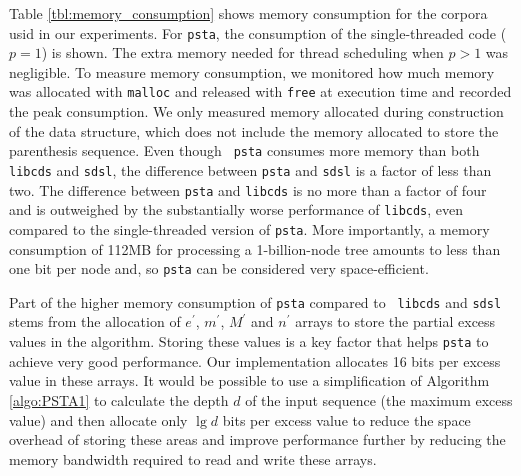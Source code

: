 Table \ref{tbl:memory_consumption} shows memory consumption for the
corpora usid in our experiments.  For {\tt psta}, the consumption of
the single-threaded code ($p = 1$) is shown.  The extra memory needed
for thread scheduling when $p > 1$ was negligible.  To measure memory
consumption, we monitored how much memory was allocated with
\texttt{malloc} and released with \texttt{free} at execution time and
recorded the peak consumption.  We only measured memory allocated
during construction of the data structure, which does not include the
memory allocated to store the parenthesis sequence.  Even though {\tt
  psta} consumes more memory than both {\tt libcds} and {\tt sdsl},
the difference between {\tt psta} and {\tt sdsl} is a factor of less
than two.  The difference between {\tt psta} and {\tt libcds} is no
more than a factor of four and is outweighed by the substantially
worse performance of {\tt libcds}, even compared to the
single-threaded version of {\tt psta}.  More importantly, a memory
consumption of 112MB for processing a 1-billion-node tree amounts to
less than one bit per node and, so {\tt psta} can be considered very
space-efficient.


Part of the higher memory consumption of {\tt psta} compared to {\tt
  libcds} and {\tt sdsl} stems from the allocation of $e^{\prime}$,
$m^{\prime}$, $M^{\prime}$ and $n^{\prime}$ arrays to store the
partial excess values in the algorithm.  Storing these values is a key
factor that helps {\tt psta} to achieve very good performance.  Our
implementation allocates 16 bits per excess value in these arrays.  It
would be possible to use a simplification of Algorithm
\ref{algo:PSTA1} to calculate the depth $d$ of the input sequence (the
maximum excess value) and then allocate only $\lg d$ bits per excess
value to reduce the space overhead of storing these areas and improve
performance further by reducing the memory bandwidth required to read
and write these arrays.

